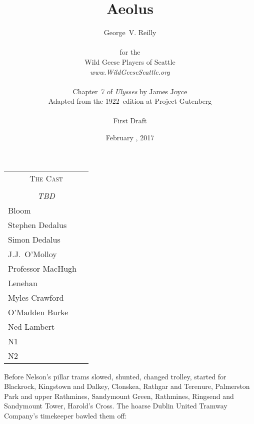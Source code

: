 


\title{\Huge Aeolus}
\author{George~V. Reilly\\
\\
{\small for the}\\
Wild Geese Players of Seattle\\
{\emph{www.WildGeeseSeattle.org}}\\
\\
{\small Chapter~7 of \emph{Ulysses} by James Joyce}\\
{\small Adapted from the 1922~edition at Project Gutenberg}
\\
\\
{\small First Draft}}
\date{February , 2017}
\raggedbottom



\maketitle
\thispagestyle{empty}
\pagebreak

\begin{tabular}{lp{10cm}}
    \multicolumn{2}{c}{\Large \textsc{The Cast}} \\
\\
    \multicolumn{2}{c}{\large \textit{TBD}} \\
Bloom \\
Stephen Dedalus \\
Simon Dedalus \\
J.J.~O'Molloy \\
Professor MacHugh \\
Lenehan \\
Myles Crawford \\
O'Madden Burke \\
Ned Lambert \\
N1 \\
N2 \\
\end{tabular}

\thispagestyle{empty}
\newpage


\setcounter{page}{1}


Before Nelson's pillar trams slowed,
shunted,
changed trolley,
started for Blackrock,
Kingstown and Dalkey,
Clonskea,
Rathgar and Terenure,
Palmerston Park and upper Rathmines,
Sandymount Green,
Rathmines,
Ringsend and Sandymount Tower,
Harold's Cross.
The hoarse Dublin United Tramway Company's timekeeper bawled them off:

